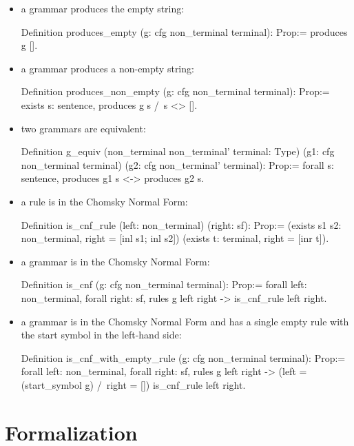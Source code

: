 \documentclass {elsarticle}
\begin{document}
\begin {itemize}
\item a grammar produces the empty string:
      \begin{coq}
	  Definition produces_empty 
	  (g: cfg non_terminal terminal): Prop:=
	  produces g [].
      \end{coq}
\item a grammar produces a non-empty string:
      \begin{coq}
	  Definition produces_non_empty 
	  (g: cfg non_terminal terminal): Prop:=
	  exists s: sentence, produces g s /\ s <> [].     
	  \end{coq}
\item two grammars are equivalent:
      \begin{coq}
	  Definition g_equiv 
	  (non_terminal non_terminal' terminal: Type) 
	  (g1: cfg non_terminal terminal) 
	  (g2: cfg non_terminal' terminal): Prop:=
      forall s: sentence,
      produces g1 s <-> produces g2 s.
	  \end{coq}
\item a rule is in the Chomsky Normal Form:
      \begin{coq}
	  Definition is_cnf_rule 
	  (left: non_terminal) (right: sf): Prop:=
      (exists s1 s2: non_terminal, right = [inl s1; inl s2]) \/
      (exists t: terminal, right = [inr t]).
	  \end{coq}
\item a grammar is in the Chomsky Normal Form:
      \begin{coq}
	  Definition is_cnf 
	  (g: cfg non_terminal terminal): Prop:=
	  forall left: non_terminal,
	  forall right: sf,
	  rules g left right -> is_cnf_rule left right.
	  \end{coq}
\item a grammar is in the Chomsky Normal Form and has a single empty rule with the start symbol in the left-hand side:
      \begin{coq}
	  Definition is_cnf_with_empty_rule 
	  (g: cfg non_terminal terminal): Prop:=
	  forall left: non_terminal,
	  forall right: sf,
	  rules g left right ->
	  (left = (start_symbol g) /\ right = []) \/
	  is_cnf_rule left right.	  
	  \end{coq}
\end {itemize}

\section {Formalization}
\label {sec-formal}
\end{document}
